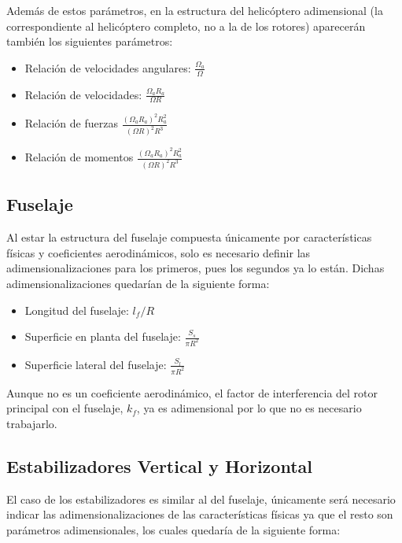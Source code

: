 Además de estos parámetros, en la estructura del helicóptero adimensional (la correspondiente al helicóptero completo, no a la de los rotores) aparecerán también los siguientes parámetros:
\singlespacing
\begin{multicols}{2}
	\begin{itemize}
		\item Relación de velocidades angulares: $\frac{\Omega_a}{\Omega}$
		\item Relación de velocidades: $\frac{\Omega_aR_a}{\Omega R}$
		\item Relación de fuerzas $\frac{(\Omega_aR_a)^2R_a^2}{(\Omega R)^2R^3}$
		\item Relación de momentos $\frac{(\Omega_aR_a)^2R_a^2}{(\Omega R)^2R^3}$
	\end{itemize}
\end{multicols}
\subsection{Fuselaje}

Al estar la estructura del fuselaje compuesta únicamente por características físicas y coeficientes aerodinámicos, solo es necesario definir las adimensionalizaciones para los primeros, pues los segundos ya lo están. Dichas adimensionalizaciones quedarían de la siguiente forma:

\begin{multicols}{2}
	\begin{itemize}
		\item Longitud del fuselaje: $l_f/R$
		\item Superficie en planta del fuselaje: $\frac{S_s}{\pi R^2}$
		\item Superficie lateral del fuselaje: $\frac{S_l}{\pi R^2}$
	\end{itemize}
\end{multicols}

Aunque no es un coeficiente aerodinámico, el factor de interferencia del rotor principal con el fuselaje, $k_f$, ya es adimensional por lo que no es necesario trabajarlo.

\subsection{Estabilizadores Vertical y Horizontal}

El caso de los estabilizadores es similar al del fuselaje, únicamente será necesario indicar las adimensionalizaciones de las características físicas ya que el resto son parámetros adimensionales, los cuales quedaría de la siguiente forma:

